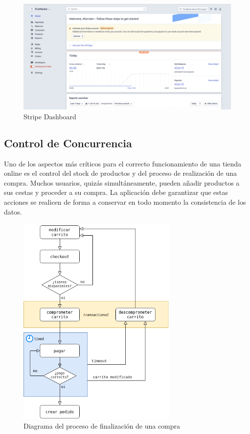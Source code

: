 \documentclass[a4paper]{article}
\begin{document}
    \begin{figure}[hbt!]
    	\centering
    	\includegraphics[width=\textwidth,keepaspectratio]{stripe_dashboard}
    	\caption{Stripe Dashboard}
    	\label{fig:stripe_dashboard}
    \end{figure}
    
    \subsection{Control de Concurrencia} \label{sec:concurrencia}
    Uno de los aspectos más críticos para el correcto funcionamiento de una tienda online es el control del stock de productos y del proceso de realización de una compra. Muchos usuarios, quizás simultáneamente, pueden añadir productos a sus cestas y proceder a su compra. La aplicación debe garantizar que estas acciones se realicen de forma a conservar en todo momento la consistencia de los datos.
    
    \begin{figure}[hbt!]
    	\centering
    	\includegraphics[width=0.7\textwidth,keepaspectratio]{cart_concurrent}
    	\caption{Diagrama del proceso de finalización de una compra}
    	\label{fig:cart_concurrent}
    \end{figure}
    
\end{document}
